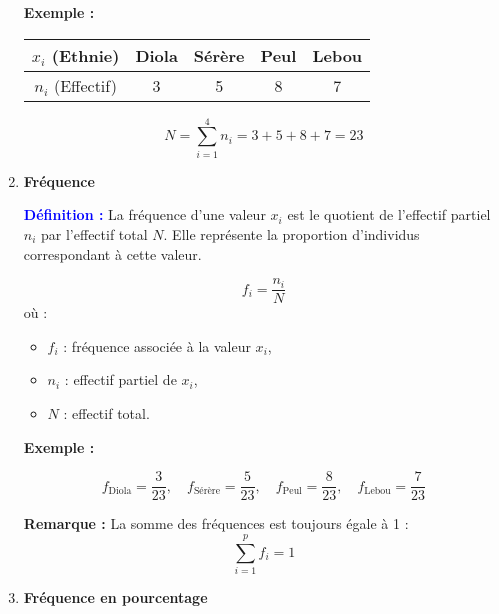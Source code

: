 \documentclass[a4paper,12pt]{article}
\begin{document}
\begin{enumerate}[leftmargin=1.5cm, label=\textbf{\arabic*)}]
\vspace{0.3cm}

\textbf{Exemple :}

\begin{center}
\begin{tabular}{|c|c|c|c|c|}
    \hline
    \( x_i \) (Ethnie) & Diola & Sérère & Peul & Lebou \\
    \hline
    \( n_i \) (Effectif) & 3 & 5 & 8 & 7 \\
    \hline
\end{tabular}
\end{center}

\vspace{0.3cm}

\[
N = \sum_{i=1}^{4} n_i = 3 + 5 + 8 + 7 = 23
\]

\item \textbf{Fréquence} \\

\begin{tcolorbox}[colback=red!5!white, colframe=red!60!black, boxrule=0.5pt]
\textcolor{blue}{\textbf{Définition :}}  
La fréquence d’une valeur \( x_i \) est le quotient de l’effectif partiel \( n_i \) par l’effectif total \( N \). Elle représente la proportion d’individus correspondant à cette valeur.

\[
f_i = \frac{n_i}{N}
\]
où :
\begin{itemize}
    \item \( f_i \) : fréquence associée à la valeur \( x_i \),
    \item \( n_i \) : effectif partiel de \( x_i \),
    \item \( N \) : effectif total.
\end{itemize}
\end{tcolorbox}

\vspace{0.3cm}

\textbf{Exemple :}

\[
f_{\text{Diola}} = \frac{3}{23}, \quad
f_{\text{Sérère}} = \frac{5}{23}, \quad
f_{\text{Peul}} = \frac{8}{23}, \quad
f_{\text{Lebou}} = \frac{7}{23}
\]

\vspace{0.3cm}
\begin{tcolorbox}[colback=blue!5!white, colframe=blue!60!black, boxrule=0.5pt]
\textbf{Remarque :} La somme des fréquences est toujours égale à 1 :
\[
\sum_{i=1}^{p} f_i = 1
\]
\end{tcolorbox}

\item \textbf{Fréquence en pourcentage} \\


\end{enumerate}
\end{document}
